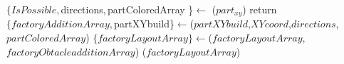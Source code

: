 \documentclass[letterpaper, 10 pt, conference]{ieeeconf}
\newcommand{\todo}[1]{\vspace{5 mm}\par \noindent \framebox{\begin{minipage}[c]{0.98 \columnwidth} \ttfamily\flushleft \textcolor{red}{#1}\end{minipage}}\vspace{5 mm}\par}
\begin{document}
\todo{Sheryl, add the algorithmic environment for Build Factory}
\begin{algorithm} 
\newcommand\algotext[1]{\end{algorithmic}#1\begin{algorithmic}[1]}
\scriptsize
\caption{ ($partXY$, $numCopies$)}
\begin{algorithmic}[1]
\State $\{ IsPossible,$directions$,$partColoredArray \}$  \leftarrow$ {}($part_{xy}$)
 return
 \EndIf
\State$\{ factoryAdditionArray, $partXYbuild\}$\leftarrow${}(\newline$partXYbuild$,$XYcoord$,$directions$,$partColoredArray$)
\State$\{ factoryLayoutArray\}\leftarrow${}(\newline$factoryLayoutArray$,$factoryObtacleadditionArray$)
\EndFor
{}($factoryLayoutArray$)
\end{algorithmic}
\end{algorithm} 
 
 
 
\end{document}
